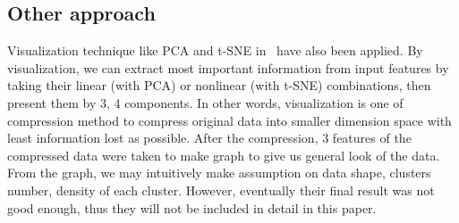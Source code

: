 \documentclass[English]{dicomopapers}
\begin{document}
\subsection{Other approach}
 Visualization technique like PCA and t-SNE in~\cite{maaten2008visualizing} have also been applied. By visualization, we can extract most important information from input features by taking their linear (with PCA) or nonlinear (with t-SNE) combinations, then present them by 3, 4 components. In other words, visualization is one of compression method to compress original data into smaller dimension space with least information lost as possible. After the compression, 3 features of the compressed data were taken to make graph to give us general look of the data. From the graph, we may intuitively make assumption on data shape, clusters number, density of each cluster. However, eventually their final result was not good enough, thus they will not be included in detail in this paper.
\end{document}
